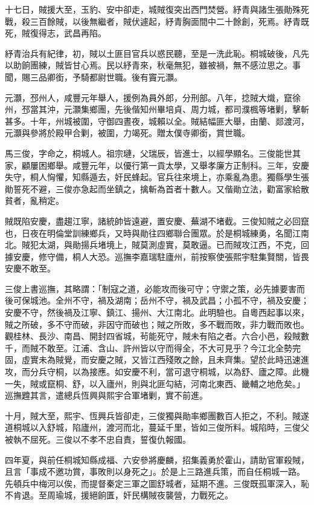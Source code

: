 \begin{pinyinscope}
十七日，賊援大至，玉豹、安中卻走，城賊復突出西門焚營。紓青與諸生張勛殊死戰，殺三百餘賊，以後無繼者，賊伏遽起，紓青胸面間中二十餘創，死焉。紓青既死，賊復得志，武昌再陷。

紓青治兵有紀律，初，賊以土匪目官兵以惑民聽，至是一洗此恥。桐城破後，凡先以助餉團練，賊皆甘心焉。民以紓青來，秋毫無犯，雖被禍，無不感泣思之。事聞，賜三品卿銜，予騎都尉世職。後有竇元灝。

元灝，邳州人，咸豐元年舉人，援例為員外郎，分刑部。八年，捻賊大熾，竄徐州，邳當其沖，元灝集鄉團，先後偕知州畢培貞、周力城，都司濮楓等堵剿，擊斬甚多。十年，州城被圍，守御四晝夜，城賴以全。賊結幅匪大舉，由蘭、郯渡河，元灝與參將於殿甲合剿，被圍，力竭死。贈太僕寺卿銜，賞世職。

馬三俊，字命之，桐城人。祖宗璉，父瑞辰，皆進士，以經學顯名。三俊能世其家，顧屢困鄉舉。咸豐元年，以優行第一貢太學，又舉孝廉方正制科。三年，安慶失守，桐人恟懼，知縣遁去，奸民蜂起。官兵往來境上，亦乘亂為患。獨縣學生張勛誓死不避，三俊亦急起而坐鎮之，擒斬為首者十數人。又偕勛立法，勸富家給散貧者，亂稍定。

賊既陷安慶，盡趨江寧，諸統帥皆遠避，置安慶、蕪湖不堵截。三俊知賊之必回竄也，日夜在明倫堂訓練鄉兵，又時與勛往四鄉聯合團眾。於是桐城練勇，名聞江南北。賊犯太湖，與勛揚兵堵境上，賊莫測虛實，莫敢逼。已而賊攻江西，不克，回據安慶，修守備，桐人大恐。巡撫李嘉瑞駐廬州，前按察使張熙宇駐集賢關，皆畏安慶不敢至。

三俊上書巡撫，其略謂：「制寇之道，必能攻而後可守；守禦之策，必先據要害而後可保城池。全州不守，禍及湖南；岳州不守，禍及武昌；小孤不守，禍及安慶；安慶不守，然後禍及江寧、鎮江、揚州、大江南北。此明驗也。自粵西起事以來，賊之所破，多不守而破，非因守而破也；賊之所敗，多不戰而敗，非力戰而敗也。觀桂林、長沙、南昌、開封四省城，茍能死守，賊未有陷之者。六合小邑，殺賊數千，而賊不敢至。江浦、含山、許州皆以守而得全，不大可見乎？今江北全勢完固，虛實未為賊覺，而安慶之賊，又皆江西殘敗之餘，且未齊集。望於此時迅速進攻，而分兵守桐，以為接應。如安慶不利，當可退守桐城，以為舒、廬之障。此機一失，賊或竄桐、舒，以入廬州，則與北匪勾結，河南北東西、畿輔之地危矣。」巡撫韙其言，遣總兵恆興與熙宇合軍堵剿，實不前進。

十月，賊大至，熙宇、恆興兵皆卻走，三俊獨與勛率鄉團數百人拒之，不利。賊遂道桐城以入舒城，陷廬州，渡河而北，蔓延千里，皆如三俊所料。城陷時，三俊父被執不屈死。三俊以不孝不忠自責，誓復仇報國。

四年夏，與前任桐城知縣成福、六安參將慶麟，招集義勇於霍山，請助官軍殺賊，且言「事成不邀功賞，事敗則以身死之」。於是上三路進兵策，而自任桐城一路。先頓兵中梅河以俟，而提督秦定三軍之圖舒城者，延期不進。三俊既孤軍深入，恥不肯退。至周瑜城，援絕餉匱，奸民構賊夜襲營，力戰死之。


\end{pinyinscope}
